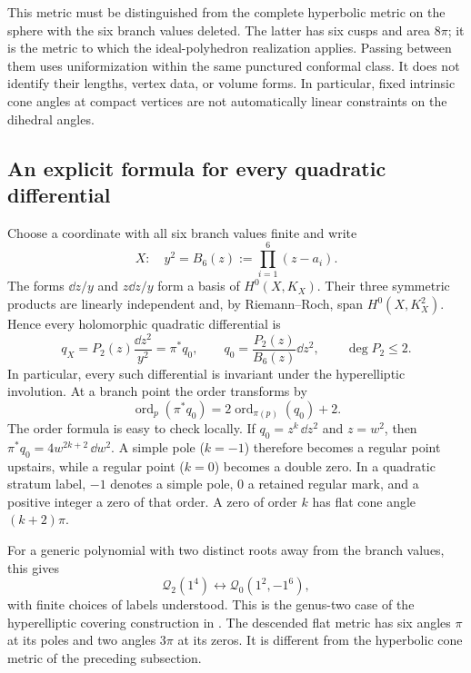This metric must be distinguished from the complete hyperbolic
metric on the sphere with the six branch values deleted.  The
latter has six cusps and area $8\pi$; it is the metric to which the
ideal-polyhedron realization applies.  Passing between them uses
uniformization within the same punctured conformal class.  It does
not identify their lengths, vertex data, or volume forms.
In particular, fixed intrinsic cone angles at compact vertices are
not automatically linear constraints on the dihedral angles.

\subsection{An explicit formula for every quadratic differential}
\label{subsec:genus2quadraticformula}

Choose a coordinate with all six branch values finite and write
\begin{equation}
 X:\quad y^2=B_6(z):=\prod_{i=1}^{6}(z-a_i).
 \label{eq:genus2curve}
\end{equation}
The forms $\dd z/y$ and $z\dd z/y$ form a basis of
$H^0(X,K_X)$.  Their three symmetric products are linearly
independent and, by Riemann--Roch, span $H^0(X,K_X^2)$.
Hence every holomorphic quadratic differential is
\begin{equation}
 q_X=P_2(z)\frac{\dd z^2}{y^2}
     =\pi^*q_0,
 \qquad
 q_0=\frac{P_2(z)}{B_6(z)}\dd z^2,
 \qquad \deg P_2\leq2.
 \label{eq:genus2qformula}
\end{equation}
In particular, every such differential is invariant under the
hyperelliptic involution.  At a branch point the order transforms by
\begin{equation}
 \operatorname{ord}_p(\pi^*q_0)
 =2\operatorname{ord}_{\pi(p)}(q_0)+2.
 \label{eq:genus2order}
\end{equation}
The order formula is easy to check locally. If
$q_0=z^k\,\dd z^2$ and $z=w^2$, then
$\pi^*q_0=4w^{2k+2}\,\dd w^2$. A simple pole ($k=-1$)
therefore becomes a regular point upstairs, while a regular
point ($k=0$) becomes a double zero. In a quadratic stratum
label, $-1$ denotes a simple pole, $0$ a retained regular mark,
and a positive integer a zero of that order. A zero of order $k$
has flat cone angle $(k+2)\pi$.

For a generic polynomial with two distinct roots away from the
branch values, this gives
\[
 \mathcal Q_2(1^4)\longleftrightarrow
 \mathcal Q_0(1^2,-1^6),
\]
with finite choices of labels understood.  This is the genus-two
case of the hyperelliptic covering construction in
\cite[Section~1.1.3]{LanneauComponents}.
The descended flat metric has six angles $\pi$ at its poles and
two angles $3\pi$ at its zeros.  It is different from the
hyperbolic cone metric of the preceding subsection.

